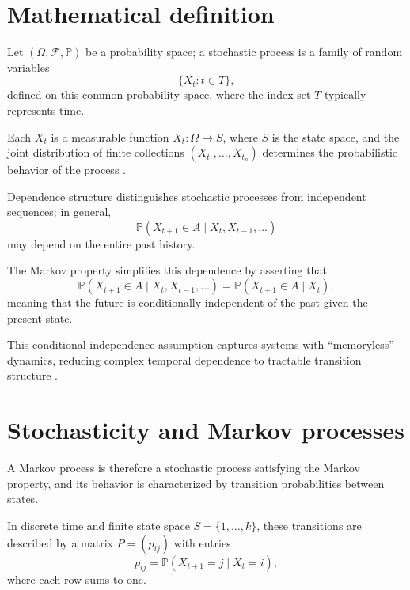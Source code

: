 
\section{Mathematical definition}

Let \((\Omega,\mathcal{F},\mathbb{P})\) be a probability space; a stochastic process is a family of random variables 
\[
\{X_t : t \in T\},
\]
defined on this common probability space, where the index set \(T\) typically represents time. 

\medskip

Each \(X_t\) is a measurable function \(X_t : \Omega \to S\), where \(S\) is the state space, and the joint distribution of finite collections \((X_{t_1},\dots,X_{t_n})\) determines the probabilistic behavior of the process \cite{kolmogorov_1933_grundbegriffe}. 

\medskip

Dependence structure distinguishes stochastic processes from independent sequences; in general,
\[
\mathbb{P}(X_{t+1} \in A \mid X_t, X_{t-1},\dots) 
\]
may depend on the entire past history. 

\medskip

The Markov property simplifies this dependence by asserting that
\[
\mathbb{P}(X_{t+1} \in A \mid X_t, X_{t-1},\dots) 
=
\mathbb{P}(X_{t+1} \in A \mid X_t),
\]
meaning that the future is conditionally independent of the past given the present state. 

\medskip

This conditional independence assumption captures systems with “memoryless” dynamics, reducing complex temporal dependence to tractable transition structure \cite{doob_1953_stochastic}. 


\section{Stochasticity and Markov processes}

A Markov process is therefore a stochastic process satisfying the Markov property, and its behavior is characterized by transition probabilities between states. 

\medskip

In discrete time and finite state space \(S = \{1,\dots,k\}\), these transitions are described by a matrix \(P = (p_{ij})\) with entries
\[
p_{ij} = \mathbb{P}(X_{t+1}=j \mid X_t=i),
\]
where each row sums to one. 

